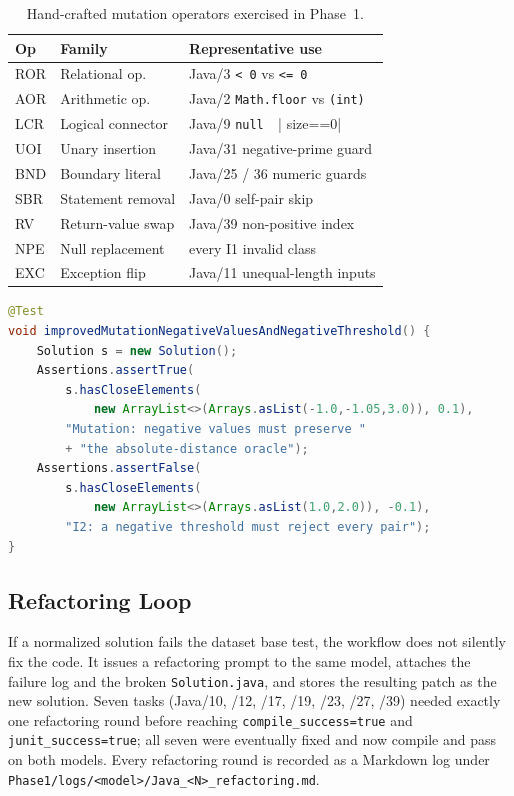 \documentclass[journal]{IEEEtran}
\begin{document}
\begin{table}[!t]
\renewcommand{\arraystretch}{1.15}
\caption{Hand-crafted mutation operators exercised in Phase~1.}
\label{tab:mutation-catalogue}
\centering
\footnotesize
\begin{tabular}{@{}lp{1.9cm}p{3.5cm}@{}}
\toprule
\textbf{Op} & \textbf{Family} & \textbf{Representative use} \\
\midrule
ROR & Relational op.        & Java/3 \verb|< 0| vs \verb|<= 0| \\
AOR & Arithmetic op.        & Java/2 \texttt{Math.floor} vs \texttt{(int)} \\
LCR & Logical connector     & Java/9 \verb|null  ||  size==0| \\
UOI & Unary insertion       & Java/31 negative-prime guard \\
BND & Boundary literal      & Java/25 / 36 numeric guards \\
SBR & Statement removal     & Java/0 self-pair skip \\
RV  & Return-value swap     & Java/39 non-positive index \\
NPE & Null replacement      & every I1 invalid class \\
EXC & Exception flip        & Java/11 unequal-length inputs \\
\bottomrule
\end{tabular}
\end{table}

\begin{lstlisting}[language=Java, caption=Hand-crafted mutation guard for Java/0 (excerpt).]
@Test
void improvedMutationNegativeValuesAndNegativeThreshold() {
    Solution s = new Solution();
    Assertions.assertTrue(
        s.hasCloseElements(
            new ArrayList<>(Arrays.asList(-1.0,-1.05,3.0)), 0.1),
        "Mutation: negative values must preserve "
        + "the absolute-distance oracle");
    Assertions.assertFalse(
        s.hasCloseElements(
            new ArrayList<>(Arrays.asList(1.0,2.0)), -0.1),
        "I2: a negative threshold must reject every pair");
}
\end{lstlisting}

\subsection{Refactoring Loop}\label{sec:refactor}

If a normalized solution fails the dataset base test, the workflow does not
silently fix the code. It issues a refactoring prompt to the same model,
attaches the failure log and the broken \texttt{Solution.java}, and stores
the resulting patch as the new solution. Seven tasks (Java/10, /12, /17,
/19, /23, /27, /39) needed exactly one refactoring round before reaching
\texttt{compile\_success=true} and \texttt{junit\_success=true}; all seven
were eventually fixed and now compile and pass on both models. Every
refactoring round is recorded as a Markdown log under
\texttt{Phase1/logs/<model>/Java\_<N>\_refactoring.md}.
\end{document}
